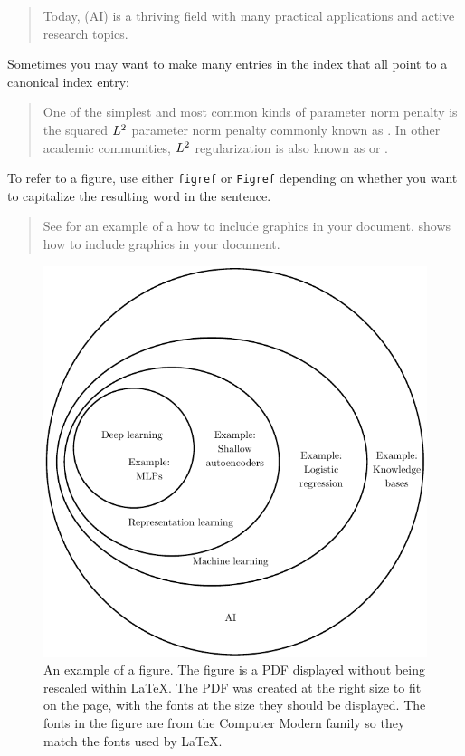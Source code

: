 \begin{quote}
Today,  (AI) is
a thriving field with many practical applications and active research topics.
\end{quote}

Sometimes you may want to make many entries in the index that all point
to a canonical index entry:

\begin{quote}
One of the simplest
and most common kinds of parameter norm penalty is
the squared $L^2$ parameter norm penalty
commonly known as .
In other academic communities,
$L^2$ regularization is also known as 
or .
\end{quote}

To refer to a figure, use either {\tt figref} or {\tt Figref} depending on
whether you want to capitalize the resulting word in the sentence.

\begin{quote}
See  for an example of a how to include graphics
in your document.
 shows how to include graphics in your document.
\end{quote}


\begin{figure}[t!]
\centering
\includegraphics{venn}
\caption{An example of a figure.
The figure is a PDF displayed without being rescaled within {\LaTeX}.
The PDF was created at the right size to fit on the page, with the
fonts at the size they should be displayed. The fonts in the figure
are from the Computer Modern family so they match the fonts used
by \LaTeX.}
\label{fig:venn}
\end{figure}

